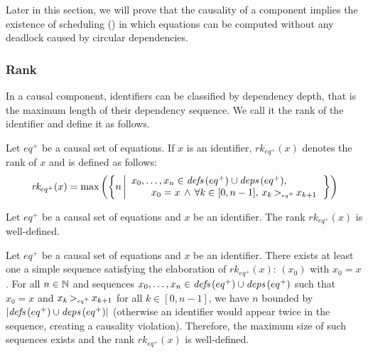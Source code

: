 Later in this section, we will prove that the causality of a component implies the existence of
scheduling () in which equations can be computed
without any deadlock caused by circular dependencies.

\subsubsection{Rank}
\label{sec:semantics:grsync:causality:rank}

\newcommand{\rank}[2]{{\ensuremath{\textit{rk}_{#1}(#2)}}}

In a causal component, identifiers can be classified by dependency depth, that is the maximum length
of their dependency sequence. We call it the rank of the identifier and define it as follows.

\begin{definition}[Rank]
    \label{def:semantics:grsync:causality:rank}
    Let $eq^+$ be a causal set of equations. If $x$ is an identifier, $\rank{eq^+}{x}$ denotes the
    rank of $x$ and is defined as follows:
    \begin{equation*}
        \rank{eq^+}{x} = \text{max}\left(\left\{n \left| \begin{array}{l}
                x_0, \dots, x_n \in \defs{eq^+} \cup \deps{eq^+}, \\
                \qquad x_0 = x \, \wedge \, \forall k \in [0, n - 1], \, \depOrd{eq^+}{x_k}{x_{k+1}}
            \end{array}\right.\right\}\right)
    \end{equation*}
\end{definition}

\begin{lemma}
    \label{lem:semantics:grsync:causality:rank:well_def}
    Let $eq^+$ be a causal set of equations and $x$ be an identifier.
    The rank $\rank{eq^+}{x}$ is well-defined.
\end{lemma}
\begin{skippableproof}
    Let $eq^+$ be a causal set of equations and $x$ be an identifier.
    There exists at least one a simple sequence satisfying the elaboration of $\rank{eq^+}{x}$:
    $(x_0)$ with $x_0 = x$.
    For all $n \in \N$ and sequences $x_0, \dots, x_n \in \defs{eq^+} \cup \deps{eq^+}$
    such that $x_0 = x$ and $\depOrd{eq^+}{x_k}{x_{k+1}}$ for all $k \in [0, n - 1]$, we have $n$
    bounded by $\left|\defs{eq^+} \cup \deps{eq^+}\right|$ (otherwise an identifier would appear
    twice in the sequence, creating a causality violation).
    Therefore, the maximum size of such sequences exists and the rank $\rank{eq^+}{x}$ is
    well-defined.
\end{skippableproof}


